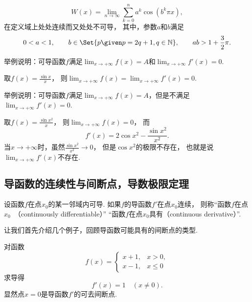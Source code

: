 \begin{example}
\[
	W(x) = \lim_{n\to\infty} \sum_{k=0}^n a^k \cos(b^k \pi x),
\]在定义域上处处连续而又处处不可导，
其中，参数\(a\)和\(b\)满足\[
	0<a<1,
	\qquad
	b\in\Set{ p \given p = 2q+1, q\in\mathbb{N} },
	\qquad
	ab > 1+\frac{3}{2}\pi.
\]
\end{example}

\begin{example}
举例说明：可导函数\(f\)满足\(\lim_{x\to+\infty} f(x) = A\)和\(\lim_{x\to+\infty} f'(x) = 0\).
\begin{solution}
取\(f(x) = \frac{\sin x}{x}\)，
则\(\lim_{x\to+\infty} f(x) = \lim_{x\to+\infty} f'(x) = 0\).
\end{solution}
\end{example}
\begin{example}
举例说明：可导函数\(f\)满足\(\lim_{x\to+\infty} f(x) = A\)，但是不满足\(\lim_{x\to+\infty} f'(x) = 0\).
\begin{solution}
取\(f(x) = \frac{\sin x^2}{x}\)，
则\(\lim_{x\to+\infty} f(x) = 0\)，
而\[
	f'(x) = 2 \cos x^2 - \frac{\sin x^2}{x^2}.
\]
当\(x\to+\infty\)时，虽然\(\frac{\sin x^2}{x^2} \to 0\)，
但是\(\cos x^2\)的极限不存在，
也就是说\(\lim_{x\to+\infty} f'(x)\)不存在.
\end{solution}
\end{example}

\subsection{导函数的连续性与间断点，导数极限定理}
\begin{definition}
设函数\(f\)在点\(x_0\)的某一邻域内可导.
如果\(f\)的导函数\(f'\)在点\(x_0\)连续，
则称“函数\(f\)在点\(x_0\)~（continuously differentiable）”
“函数\(f\)在点\(x_0\)具有（continuous derivative）”.
\end{definition}

让我们首先介绍几个例子，回顾导函数可能具有的间断点的类型.

\begin{example}
对函数\[
	f(x) = \left\{ \begin{array}{cl}
		x+1, & x>0, \\
		x-1, & x\leq0
	\end{array} \right.
\]求导得\[
	f'(x) = 1
	\quad(x\neq0).
\]
显然点\(x=0\)是导函数\(f'\)的可去间断点.
\end{example}

